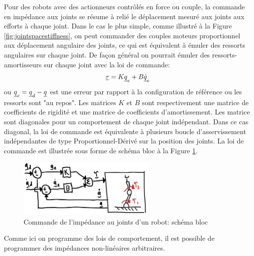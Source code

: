 Pour des robots avec des actionneurs contrôlés en force ou couple, la commande en impédance aux joints se résume à relié le déplacement mesuré aux joints aux efforts à chaque joint. Dans le cas le plus simple, comme illustré à la Figure \ref{fig:jointspacestiffness}, on peut commander des couples moteurs proportionnel aux déplacement angulaire des joints, ce qui est équivalent à émuler des ressorts angulaires sur chaque joint. De façon général on pourrait émuler des ressorts-amortisseurs sur chaque joint avec la loi de commande:
\begin{align}
\underline{\tau} = K \underline{q}_e + B \underline{\dot{q}}_e
\label{eq:jointspaceimpe}
\end{align}
ou $\underline{q}_e = \underline{q}_d - \underline{q}$ est une erreur par rapport à la configuration de référence ou les ressorts sont "au repos". Les matrices $K$ et $B$ sont respectivement une matrice de coefficients de rigidité et une matrice de coefficients d'amortissement. Les matrice sont diagonales pour un comportement de chaque joint indépendant. Dans ce cas diagonal, la loi de commande est équivalente à plusieurs boucle d'asservissement indépendantes de type Proportionnel-Dérivé sur la position des joints. La loi de commande est illustrée sous forme de schéma bloc à la Figure \ref{fig:impedancecontroljoint}.
\begin{figure}[h]
	\centering
		\includegraphics[width=0.6\textwidth]{fig/impedancecontroljoint.jpg}
	\caption{Commande de l'impédance au joints d'un robot: schéma bloc}
	\label{fig:impedancecontroljoint}
\end{figure}
Comme ici on programme des lois de comportement, il est possible de programmer des impédances non-linéaires arbitraires. 

